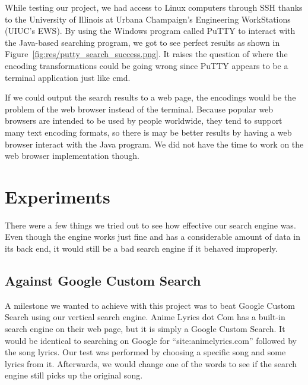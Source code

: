 \documentclass{acm} %
\begin{document}
\begin{CJK}{UTF8}{zhsong}

While testing our project, we had access to Linux computers through SSH thanks to the University of Illinois at Urbana Champaign's Engineering WorkStations (UIUC's EWS). By using the Windows program called PuTTY to interact with the Java-based searching program, we got to see perfect results as shown in Figure~\ref{fig:res/putty_search_success.png}. It raises the question of where the encoding transformations could be going wrong since PuTTY appears to be a terminal application just like cmd.


If we could output the search results to a web page, the encodings would be the problem of the web browser instead of the terminal. Because popular web browsers are intended to be used by people worldwide, they tend to support many text encoding formats, so there is may be better results by having a web browser interact with the Java program. We did not have the time to work on the web browser implementation though.

\section{Experiments}

There were a few things we tried out to see how effective our search engine was. Even though the engine works just fine and has a considerable amount of data in its back end, it would still be a bad search engine if it behaved improperly.


\subsection{Against Google Custom Search}

A milestone we wanted to achieve with this project was to beat Google Custom Search using our vertical search engine. Anime Lyrics dot Com has a built-in search engine on their web page, but it is simply a Google Custom Search. It would be identical to searching on Google for ``site:animelyrics.com'' followed by the song lyrics. Our test was performed by choosing a specific song and some lyrics from it. Afterwards, we would change one of the words to see if the search engine still picks up the original song.


\end{CJK}
\end{document}
